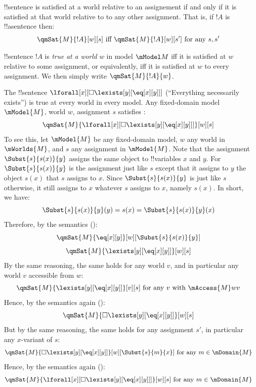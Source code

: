\documentclass[../../../include/open-logic-section]{subfiles}
\begin{document}
\begin{prop}
 !!{sentence} is satisfied at a world relative to an 
assignement if and only if it is satisfied at that world relative to 
to any other assignment. That is, if $!A$ is !!a{sentence} then:
$$\qmSat{M}{!A}[w][s]\text{ iff }\qmSat{M}{!A}[w][s']\text{ for any }s,s'$$
\end{prop}

\begin{defn}[truth-at-w]
 !!{sentence} $!A$ is \emph{true at a world} $w$
in model $\mModel M$ iff it is satisfied at $w$ relative to some assignment, 
or equivalently, iff it is satisfied at $w$ to every assignment.
We then simply write $\qmSat{M}{!A}{w}$. 
\end{defn}

\begin{ex}
The !!{sentence} $\lforall[x][\Box\lexists[y][\eq[x][y]]]$ 
(``Everything necessarily exists'') is true at every world in every model. 
Any fixed-domain model $\mModel{M}$, world $w$, assignment $s$ satisfies
:
$$\qmSat{M}{\lforall[x][\Box\lexists[y][\eq[x][y]]]}[w][s]$$
To see this, let $\mModel{M}$ be any fixed-domain model, $w$ any world
in $\mWorlds{M}$, and $s$ any assignment in $\mModel{M}$. Note that the 
assignment $\Subst{s}{s(x)}{y}$ assigns the same object to !!{variable}s
$x$ and $y$. For $\Subst{s}{s(x)}{y}$ is the assignment just like $s$ except
that it assigns to $y$ the object $s(x)$ that $s$ assigns to $x$. Since
$\Subst{s}{s(x)}{y}$ is just like $s$ otherwise, it still assigns 
to $x$ whatever $s$ assigns to $x$, namely $s(x)$. In short, we have:
$$\Subst{s}{s(x)}{y}(y)=s(x)=\Subst{s}{s(x)}{y}(x)$$
Therefore, by the semantics ():
$$\qmSat{M}{\eq[x][y]}[w][\Subst{s}{s(x)}{y}]$$
$$\qmSat{M}{\lexists[y][\eq[x][y]]}[w][s]$$
By the same reasoning, the same holds for any world $v$, and in particular
any world $v$ accessible from $w$:
$$\qmSat{M}{\lexists[y][\eq[x][y]]}[v][s]\text{ for any }v\text{ with }\mAccess{M}wv$$
Hence, by the semantics again ():
$$\qmSat{M}{\Box \lexists[y][\eq[x][y]]}[w][s]$$
But by the same reasoning, the same holds for any assignment $s'$, in 
particular any $x$-variant of $s$:
$$\qmSat{M}{\Box \lexists[y][\eq[x][y]]}[w][\Subst{s}{m}{x}]\text{ for any }m\in\mDomain{M}$$
Hence, by the semantics again ():
$$\qmSat{M}{\lforall[x][\Box \lexists[y][\eq[x][y]]]}[w][s]\text{ for any }m\in\mDomain{M}$$
\end{ex}
\end{document}
